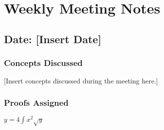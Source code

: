 \documentclass{article}
\begin{document}
\section*{Weekly Meeting Notes}

\subsection*{Date: [Insert Date]}

\subsubsection*{Concepts Discussed}

[Insert concepts discussed during the meeting here.]

\subsubsection*{Proofs Assigned}

$y=4\int x^2 \sqrt{y}$
\end{document}
